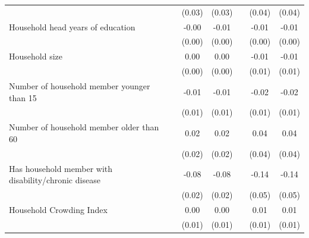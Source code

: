 {\begin{tabular}{l*{6}{c}}
                    &                     &      (0.03)         &      (0.03)         &                     &      (0.04)         &      (0.04)         \\
Household head years of education&                     &       -0.00\sym{*}  &       -0.01\sym{*}  &                     &       -0.01\sym{*}  &       -0.01\sym{*}  \\
                    &                     &      (0.00)         &      (0.00)         &                     &      (0.00)         &      (0.00)         \\
Household size      &                     &        0.00         &        0.00         &                     &       -0.01         &       -0.01         \\
                    &                     &      (0.00)         &      (0.00)         &                     &      (0.01)         &      (0.01)         \\
Number of household member younger than 15&                     &       -0.01         &       -0.01         &                     &       -0.02         &       -0.02         \\
                    &                     &      (0.01)         &      (0.01)         &                     &      (0.01)         &      (0.01)         \\
Number of household member older than 60&                     &        0.02         &        0.02         &                     &        0.04         &        0.04         \\
                    &                     &      (0.02)         &      (0.02)         &                     &      (0.04)         &      (0.04)         \\
Has household member with disability/chronic disease&                     &       -0.08\sym{***}&       -0.08\sym{***}&                     &       -0.14\sym{**} &       -0.14\sym{**} \\
                    &                     &      (0.02)         &      (0.02)         &                     &      (0.05)         &      (0.05)         \\
Household Crowding Index&                     &        0.00         &        0.00         &                     &        0.01         &        0.01         \\
                    &                     &      (0.01)         &      (0.01)         &                     &      (0.01)         &      (0.01)         \\

\end{tabular}}
